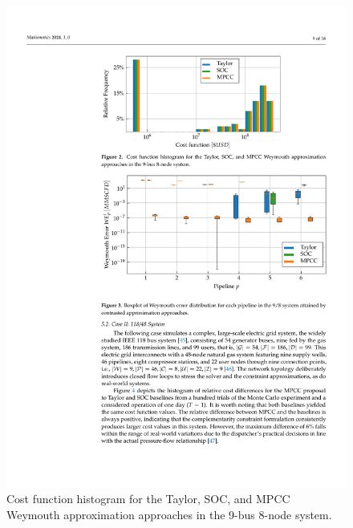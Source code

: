 \begin{figure}[h]
    \centering
    \includegraphics[scale=0.8]{figures/Chapter_MPCC/g001.pdf}
    \caption{Cost function histogram for the Taylor, SOC, and MPCC Weymouth approximation approaches in the 9-bus 8-node system.}
    \label{fig:blue_test_cost}
\end{figure}






